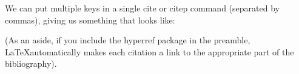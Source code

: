 \documentclass[11pt,a4paper]{article}
\begin{document}
We can put multiple keys in a single cite{} or citep{} command (separated by commas), giving us something that looks like:  \citep{Pluess2010,Levine2004a}


(As an aside, if you include the hyperref package in the preamble, \LaTeX automatically makes each citation a link to the appropriate part of the bibliography).




\end{document}
